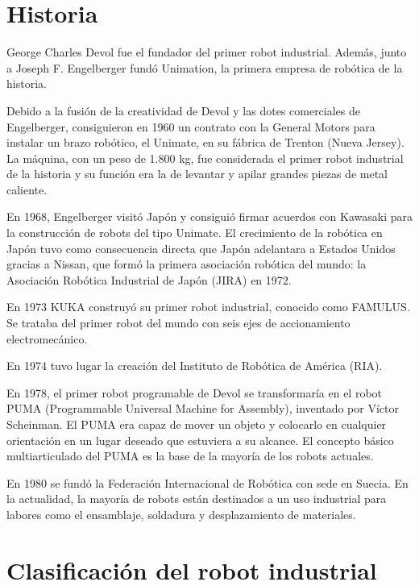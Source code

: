 \documentclass[12pt,a4paper]{report}
\begin{document}
\section{Historia}

George Charles Devol fue el fundador del primer robot industrial.
Además, junto a Joseph F. Engelberger fundó Unimation, la primera empresa de
robótica de la historia.

Debido a la fusión de la creatividad de Devol y las dotes comerciales de
Engelberger, consiguieron en 1960 un contrato con la General Motors para
instalar un brazo robótico, el Unimate, en su fábrica de Trenton (Nueva Jersey).
La máquina, con un peso de 1.800 kg, fue considerada el primer robot industrial
de la historia y su función era la de levantar y apilar grandes piezas de metal
caliente.

En 1968, Engelberger visitó Japón y consiguió firmar acuerdos con Kawasaki para
la construcción de robots del tipo Unimate. El crecimiento de la robótica en
Japón tuvo como consecuencia directa que Japón adelantara a Estados Unidos
gracias a Nissan, que formó la primera asociación robótica del mundo: la
Asociación Robótica Industrial de Japón (JIRA) en 1972. 

En 1973 KUKA construyó su primer robot industrial, conocido como FAMULUS. Se
trataba del primer robot del mundo con seis ejes de accionamiento
electromecánico.

En 1974 tuvo lugar la creación del Instituto de
Robótica de América (RIA).

En 1978, el primer robot programable de Devol se transformaría en el robot PUMA
(Programmable Universal Machine for Assembly), inventado por Víctor Scheinman. El PUMA era capaz de mover un
objeto y colocarlo en cualquier orientación en un lugar deseado que estuviera a
su alcance. El concepto básico multiarticulado del PUMA es la base de la mayoría
de los robots actuales.

En 1980 se fundó la Federación Internacional de Robótica con sede en Suecia.
En la actualidad, la mayoría de robots están destinados a un uso industrial para
labores como el ensamblaje, soldadura y desplazamiento de materiales.

\section{Clasificación del robot industrial}
\end{document}
